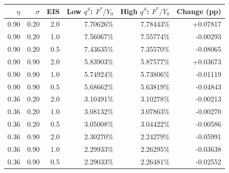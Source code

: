 \begin{tabular}{rrrrrr}
\toprule
$\eta$ & $\sigma$ & EIS & Low $q^S$: $F^*/Y_0$ & High $q^S$: $F^*/Y_0$ & Change (pp)\\
\midrule
0.90 & 0.20 & 2.0 & 7.70626\% & 7.78443\% & +0.07817\\
0.90 & 0.20 & 1.0 & 7.56067\% & 7.55774\% & -0.00293\\
0.90 & 0.20 & 0.5 & 7.43635\% & 7.35570\% & -0.08065\\
\midrule
0.90 & 0.90 & 2.0 & 5.83903\% & 5.87577\% & +0.03673\\
0.90 & 0.90 & 1.0 & 5.74924\% & 5.73806\% & -0.01119\\
0.90 & 0.90 & 0.5 & 5.68662\% & 5.63819\% & -0.04843\\
\midrule
0.36 & 0.20 & 2.0 & 3.10491\% & 3.10278\% & -0.00213\\
0.36 & 0.20 & 1.0 & 3.08132\% & 3.07863\% & -0.00270\\
0.36 & 0.20 & 0.5 & 3.05008\% & 3.04422\% & -0.00586\\
\midrule
0.36 & 0.90 & 2.0 & 2.30270\% & 2.24279\% & -0.05991\\
0.36 & 0.90 & 1.0 & 2.29933\% & 2.26295\% & -0.03638\\
0.36 & 0.90 & 0.5 & 2.29033\% & 2.26481\% & -0.02552\\
\bottomrule
\end{tabular}
